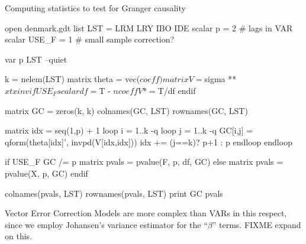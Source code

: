 \begin{script}[htbp]
  \caption{Computing statistics to test for Granger causality}
  \label{GCtest}
\begin{scode}
open denmark.gdt
list LST = LRM LRY IBO IDE
scalar p = 2 # lags in VAR
scalar USE_F = 1 # small sample correction?

var p LST --quiet

k = nelem(LST)
matrix theta = vec($coeff)
matrix V = $sigma ** $xtxinv
if USE_F
  scalar df = $T - $ncoeff
  V *= $T/df
endif

matrix GC = zeros(k, k)
colnames(GC, LST)
rownames(GC, LST)

matrix idx = seq(1,p) + 1
loop i = 1..k -q
  loop j = 1..k -q
    GC[i,j] = qform(theta[idx]', invpd(V[idx,idx]))
    idx += (j==k)? p+1 : p
  endloop
endloop

if USE_F
  GC /= p
  matrix pvals = pvalue(F, p, df, GC)
else
  matrix pvals = pvalue(X, p, GC)
endif

colnames(pvals, LST)
rownames(pvals, LST)
print GC pvals
\end{scode}
\end{script}

Vector Error Correction Models are more complex than VARs in this
respect, since we employ Johansen's variance estimator for the
``$\beta$'' terms. FIXME expand on this.

